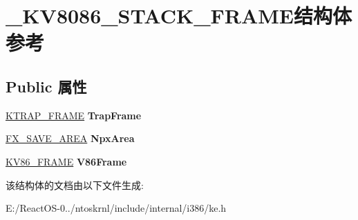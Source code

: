 \hypertarget{struct___k_v8086___s_t_a_c_k___f_r_a_m_e}{}\section{\+\_\+\+K\+V8086\+\_\+\+S\+T\+A\+C\+K\+\_\+\+F\+R\+A\+M\+E结构体 参考}
\label{struct___k_v8086___s_t_a_c_k___f_r_a_m_e}
\subsection*{Public 属性}
\begin{DoxyCompactItemize}
\item 
\mbox{\label{struct___k_v8086___s_t_a_c_k___f_r_a_m_e_a13f8051b657024f079e1c193b4dfccba}} 
\hyperlink{struct___k_t_r_a_p___f_r_a_m_e}{K\+T\+R\+A\+P\+\_\+\+F\+R\+A\+ME} {\bfseries Trap\+Frame}
\item 
\mbox{\label{struct___k_v8086___s_t_a_c_k___f_r_a_m_e_abecc6cb27b3df0e61de1cf8f76952621}} 
\hyperlink{struct___f_x___s_a_v_e___a_r_e_a}{F\+X\+\_\+\+S\+A\+V\+E\+\_\+\+A\+R\+EA} {\bfseries Npx\+Area}
\item 
\mbox{\label{struct___k_v8086___s_t_a_c_k___f_r_a_m_e_ab893796397cdce7b9ff52e269aaa16e8}} 
\hyperlink{struct___k_v86___f_r_a_m_e}{K\+V86\+\_\+\+F\+R\+A\+ME} {\bfseries V86\+Frame}
\end{DoxyCompactItemize}


该结构体的文档由以下文件生成\+:\begin{DoxyCompactItemize}
\item 
E\+:/\+React\+O\+S-\/0../ntoskrnl/include/internal/i386/ke.\+h\end{DoxyCompactItemize}
